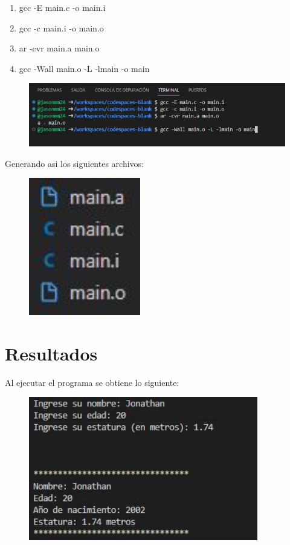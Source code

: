 \documentclass{article}
\begin{document}
\begin{enumerate}

    \item gcc -E main.c -o main.i
    \item gcc -c main.i -o main.o
    \item ar -cvr main.a main.o
    \item gcc -Wall main.o -L -lmain -o main
    
\end{enumerate}

\begin{figure}[H]
    \centering
    \includegraphics[width = 18cm]{Comandos.jpg}
\end{figure}

Generando asi los siguientes archivos:

\begin{figure}[H]
    \centering
    \includegraphics[height = 6cm]{Archivos.jpg}
\end{figure}

\newpage

\section{Resultados}

Al ejecutar el programa se obtiene lo siguiente:

\begin{figure}[H]
    \centering
    \includegraphics[width = 10cm]{Programa.jpg}
\end{figure}
\end{document}
